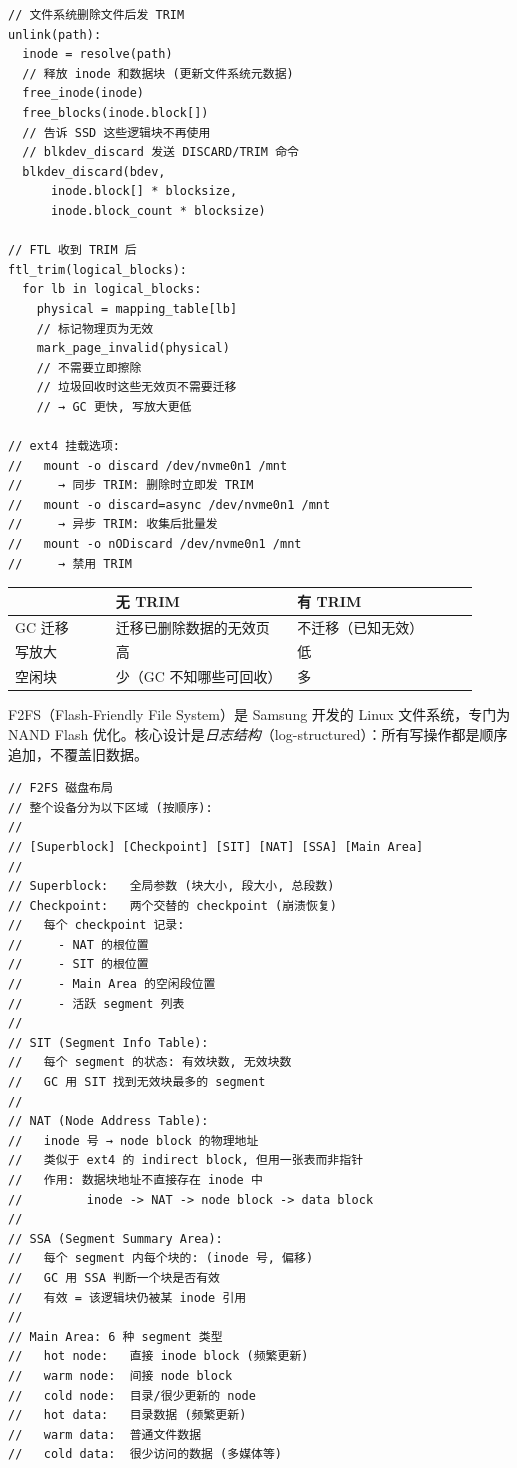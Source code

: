 \begin{filesystemlayout}
\begin{lstlisting}
// 文件系统删除文件后发 TRIM
unlink(path):
  inode = resolve(path)
  // 释放 inode 和数据块 (更新文件系统元数据)
  free_inode(inode)
  free_blocks(inode.block[])
  // 告诉 SSD 这些逻辑块不再使用
  // blkdev_discard 发送 DISCARD/TRIM 命令
  blkdev_discard(bdev,
      inode.block[] * blocksize,
      inode.block_count * blocksize)

// FTL 收到 TRIM 后
ftl_trim(logical_blocks):
  for lb in logical_blocks:
    physical = mapping_table[lb]
    // 标记物理页为无效
    mark_page_invalid(physical)
    // 不需要立即擦除
    // 垃圾回收时这些无效页不需要迁移
    // → GC 更快, 写放大更低

// ext4 挂载选项:
//   mount -o discard /dev/nvme0n1 /mnt
//     → 同步 TRIM: 删除时立即发 TRIM
//   mount -o discard=async /dev/nvme0n1 /mnt
//     → 异步 TRIM: 收集后批量发
//   mount -o nODiscard /dev/nvme0n1 /mnt
//     → 禁用 TRIM
\end{lstlisting}

\begin{longtable}{|F{0.2\linewidth}|F{0.36\linewidth}|F{0.36\linewidth}|}
\toprule
{}
& 无 TRIM & 有 TRIM \\
\midrule
GC 迁移 & 迁移已删除数据的无效页 & 不迁移（已知无效） \\\tablerowrule
写放大 & 高 & 低 \\\tablerowrule
空闲块 & 少（GC 不知哪些可回收） & 多 \\
\bottomrule
\end{longtable}


F2FS（Flash-Friendly File System）是 Samsung 开发的 Linux 文件系统，专门为 NAND Flash 优化。核心设计是\emph{日志结构}（log-structured）：所有写操作都是顺序追加，不覆盖旧数据。

\begin{lstlisting}
// F2FS 磁盘布局
// 整个设备分为以下区域 (按顺序):
//
// [Superblock] [Checkpoint] [SIT] [NAT] [SSA] [Main Area]
//
// Superblock:   全局参数 (块大小, 段大小, 总段数)
// Checkpoint:   两个交替的 checkpoint (崩溃恢复)
//   每个 checkpoint 记录:
//     - NAT 的根位置
//     - SIT 的根位置
//     - Main Area 的空闲段位置
//     - 活跃 segment 列表
//
// SIT (Segment Info Table):
//   每个 segment 的状态: 有效块数, 无效块数
//   GC 用 SIT 找到无效块最多的 segment
//
// NAT (Node Address Table):
//   inode 号 → node block 的物理地址
//   类似于 ext4 的 indirect block, 但用一张表而非指针
//   作用: 数据块地址不直接存在 inode 中
//         inode -> NAT -> node block -> data block
//
// SSA (Segment Summary Area):
//   每个 segment 内每个块的: (inode 号, 偏移)
//   GC 用 SSA 判断一个块是否有效
//   有效 = 该逻辑块仍被某 inode 引用
//
// Main Area: 6 种 segment 类型
//   hot node:   直接 inode block (频繁更新)
//   warm node:  间接 node block
//   cold node:  目录/很少更新的 node
//   hot data:   目录数据 (频繁更新)
//   warm data:  普通文件数据
//   cold data:  很少访问的数据 (多媒体等)
\end{lstlisting}


\end{filesystemlayout}
